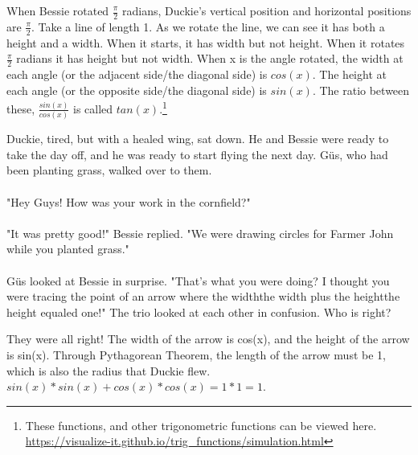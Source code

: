 {When Bessie rotated $\frac{\pi}{2}$ radians, Duckie's vertical position and horizontal positions are $\frac{\pi}{2}$.}
{Take a line of length 1. As we rotate the line, we can see it has both a height and a width. When it starts, it has width but not height. When it rotates $\frac{\pi}{2}$ radians it has height but not width. When x is the angle rotated, the width at each angle (or the adjacent side/the diagonal side) is $cos(x)$. The height at each angle (or the opposite side/the diagonal side) is $sin(x)$. The ratio between these, $\frac{sin(x)}{cos(x)}$ is called $tan(x)$.\footnote{These functions, and other trigonometric functions can be viewed here. \url{https://visualize-it.github.io/trig_functions/simulation.html}}}
{}
{Duckie, tired, but with a healed wing, sat down. He and Bessie were ready to take the day off, and he was ready to start flying the next day. Güs, who had been planting grass, walked over to them. 
\paragraph{} "Hey Guys! How was your work in the cornfield?"
\paragraph{} "It was pretty good!" Bessie replied. "We were drawing circles for Farmer John while you planted grass."
\paragraph{} Güs looked at Bessie in surprise. "That's what you were doing? I thought you were tracing the point of an arrow where the width\texttimes the width plus the height\texttimes the height equaled one!"
The trio looked at each other in confusion. Who is right?}
{They were all right! The width of the arrow is cos(x), and the height of the arrow is sin(x). Through Pythagorean Theorem, the length of the arrow must be 1, which is also the radius that Duckie flew.}
{$sin(x)\ast sin(x) + cos(x)\ast cos(x) = 1\ast 1 = 1$.}
{}